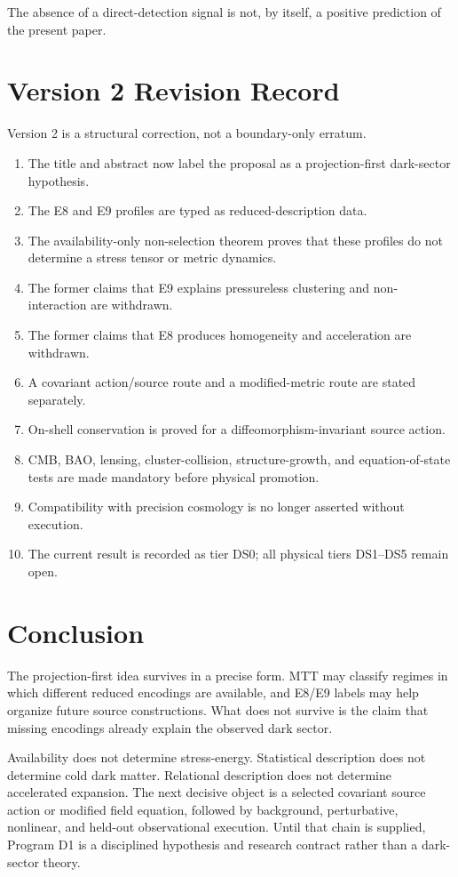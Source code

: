 \documentclass[11pt]{article}
\begin{document}
The absence of a direct-detection signal is not, by itself, a positive
prediction of the present paper.

\section{Version 2 Revision Record}

Version 2 is a structural correction, not a boundary-only erratum.

\begin{enumerate}[label=\arabic*.]
\item The title and abstract now label the proposal as a projection-first
dark-sector hypothesis.
\item The E8 and E9 profiles are typed as reduced-description data.
\item The availability-only non-selection theorem proves that these profiles
do not determine a stress tensor or metric dynamics.
\item The former claims that E9 explains pressureless clustering and
non-interaction are withdrawn.
\item The former claims that E8 produces homogeneity and acceleration are
withdrawn.
\item A covariant action/source route and a modified-metric route are stated
separately.
\item On-shell conservation is proved for a diffeomorphism-invariant source
action.
\item CMB, BAO, lensing, cluster-collision, structure-growth, and
equation-of-state tests are made mandatory before physical promotion.
\item Compatibility with precision cosmology is no longer asserted without
execution.
\item The current result is recorded as tier DS0; all physical tiers DS1--DS5
remain open.
\end{enumerate}

\section{Conclusion}

The projection-first idea survives in a precise form.  MTT may classify
regimes in which different reduced encodings are available, and E8/E9 labels
may help organize future source constructions.  What does not survive is the
claim that missing encodings already explain the observed dark sector.

Availability does not determine stress-energy.  Statistical description does
not determine cold dark matter.  Relational description does not determine
accelerated expansion.  The next decisive object is a selected covariant
source action or modified field equation, followed by background,
perturbative, nonlinear, and held-out observational execution.  Until that
chain is supplied, Program D1 is a disciplined hypothesis and research
contract rather than a dark-sector theory.
\end{document}
